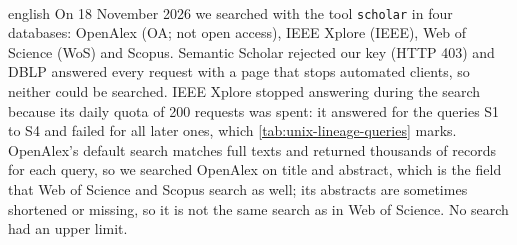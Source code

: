 \paragraph{} %
\begin{onlyin}{english} %
On 18 November 2026 we searched with the tool \texttt{scholar} in four
databases: OpenAlex (OA; not open access), IEEE Xplore (IEEE),
Web of Science (WoS) and Scopus.
Semantic Scholar rejected our key (HTTP 403) and DBLP answered every
request with a page that stops automated clients, so neither could be
searched.
IEEE Xplore stopped answering during the search because its daily quota
of 200 requests was spent: it answered for the queries S1 to S4 and
failed for all later ones, which \cref{tab:unix-lineage-queries} marks.
OpenAlex's default search matches full texts and returned thousands of
records for each query, so we searched OpenAlex on title and abstract,
which is the field that Web of Science and Scopus search as well; its
abstracts are sometimes shortened or missing, so it is not the same search
as in Web of Science.
No search had an upper limit.


\end{onlyin}
